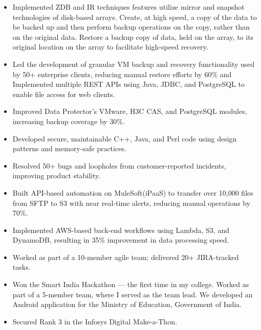 \documentclass[10pt,a4paper,withhyper]{altacv}
\begin{document}
\begin{paracol}{2}
\begin{itemize}
    \item Implemented ZDB and IR techniques features utilize mirror and snapshot technologies of disk-based arrays.
    Create, at high speed, a copy of the data to be backed up and then perform backup operations on the copy, rather than on the original data.
    Restore a backup copy of data, held on the array, to its original location on the array to facilitate high-speed recovery.
    \item Led the development of granular VM backup and recovery functionality used by 50+ enterprise clients, reducing manual restore efforts by 60\% and Implemented multiple REST APIs using Java, JDBC, and PostgreSQL to enable file access for web clients.
    \item Improved Data Protector's VMware, H3C CAS, and PostgreSQL modules, increasing backup coverage by 30\%.
    \item Developed secure, maintainable C++, Java, and Perl code using design patterns and memory-safe practices.
    \item Resolved 50+ bugs and loopholes from customer-reported incidents, improving product stability.
\end{itemize}

\divider

\begin{itemize}
    \item Built API-based automation on MuleSoft(iPaaS) to transfer over 10,000 files from SFTP to S3 with near real-time alerts, reducing manual operations by 70\%.
    \item Implemented AWS-based back-end workflows using Lambda, S3, and DynamoDB, resulting in 35\% improvement in data processing speed.
    \item Worked as part of a 10-member agile team; delivered 20+ JIRA-tracked tasks.
\end{itemize}


\switchcolumn

\begin{itemize}
    \item Won the Smart India Hackathon — the first time in my college. Worked as part of a 5-member team, where I served as the team lead. We developed an Android application for the Ministry of Education, Government of India.
    \item Secured Rank 3 in the Infosys Digital Make-a-Thon.
\end{itemize}


\end{paracol}
\end{document}
